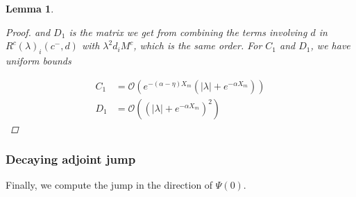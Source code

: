 \documentclass[12pt]{article}
\newtheorem{lemma}{Lemma}
\begin{document}
\begin{lemma}
\begin{proof}
and $D_1$ is the matrix we get from combining the terms involving $d$ in $R^c(\lambda)_i(c^-, d)$ with $\lambda^2 d_i M^c$, which is the same order. For $C_1$ and $D_1$, we have uniform bounds

\begin{align*}
C_1 &= \mathcal{O}(e^{-(\alpha - \eta) X_m}(|\lambda| + e^{-\alpha X_m})) \\
D_1 &= \mathcal{O}((|\lambda| + e^{-\alpha X_m})^2)
\end{align*}

\end{proof}
\end{lemma}

\subsubsection{Decaying adjoint jump}

Finally, we compute the jump in the direction of $\Psi(0)$.
\end{document}
